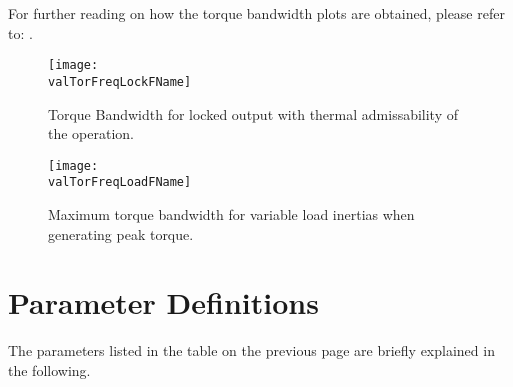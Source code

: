 \documentclass[a4paper,10pt]{cjtdsheet}      %
\begin{document}
\begin{multicols}{2}
For further reading on how the torque bandwidth plots are obtained, please refer to: \cite{Malzahn_2017}.

\end{multicols}


\begin{figure}%
		\texttt{[image: \\valTorFreqLockFName]}
		\caption{Torque Bandwidth for locked output with thermal admissability of the operation.}
	\label{fig:TorqueBandwidthLocked}
\end{figure}



\begin{figure}%
		\texttt{[image: \\valTorFreqLoadFName]}
		\caption{Maximum torque bandwidth for variable load inertias when generating peak torque.}
	\label{fig:TorqueBandwidthLoad}
\end{figure}

\section*{Parameter Definitions}
The parameters listed in the table on the previous page are briefly explained in the following.
\end{document}

